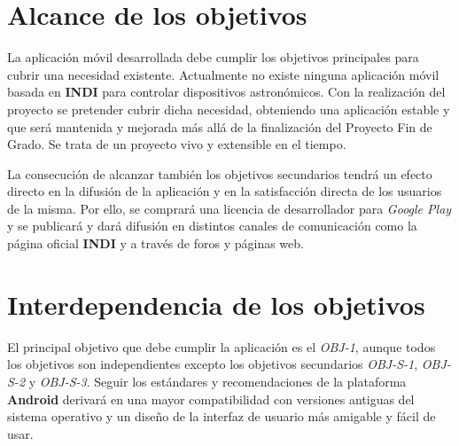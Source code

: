 \section{Alcance de los objetivos}

La aplicación móvil desarrollada debe cumplir los objetivos principales para cubrir una necesidad existente. Actualmente no existe ninguna aplicación móvil basada en \textbf{INDI} para controlar dispositivos astronómicos. Con la realización del proyecto se pretender cubrir dicha necesidad, obteniendo una aplicación estable y que será mantenida y mejorada más allá de la finalización del Proyecto Fin de Grado. Se trata de un proyecto vivo y extensible en el tiempo.

\bigskip
La consecución de alcanzar también los objetivos secundarios tendrá un efecto directo en la difusión de la aplicación y en la satisfacción directa de los usuarios de la misma. Por ello, se comprará una licencia de desarrollador para \textit{Google Play} y se publicará y dará difusión en distintos canales de comunicación como la página oficial \textbf{INDI} y a través de foros y páginas web.


\section{Interdependencia de los objetivos}

El principal objetivo que debe cumplir la aplicación es el \textit{OBJ-1}, aunque todos los objetivos son independientes excepto los objetivos secundarios \textit{OBJ-S-1}, \textit{OBJ-S-2} y \textit{OBJ-S-3}. Seguir los estándares y recomendaciones de la plataforma \textbf{Android} derivará en una mayor compatibilidad con versiones antiguas del sistema operativo y un diseño de la interfaz de usuario más amigable y fácil de usar. 
